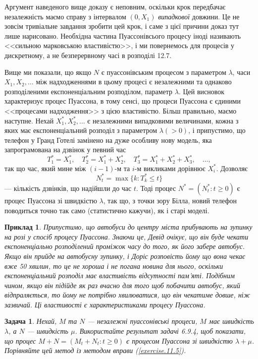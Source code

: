 \documentclass[12pt,fleqn]{article}
\newtheorem{example}{Приклад}[section]
\newtheorem{problem}{Задача}[section]
\numberwithin{figure}{section}
\numberwithin{equation}{section}
\begin{document}
Аргумент наведеного вище доказу є неповним, оскільки крок передбачає незалежність маємо справу з інтервалом $(0, X_1)$ \emph{випадкової} довжини. Це не зовсім тривіальне завдання зробити цей крок, і саме з цієї причини доказ тут лише нарисовано. Необхідна частина Пуассонівсього процесу іноді називають <<сильною марковською властивістю>>, і ми повернемось для процесів у дискретному, а не безперервному часі в розподілі 12.7.

Вище ми показали, що якщо $N$ є пуассонівським процесом з параметром $\lambda$, часи $X_1, X_2, \dots$ між надходженнями в цьому процесі є незалежними та однаково розподіленими експоненціальним розподілом, параметр $\lambda$. Цей висновок характеризує процес Пуассона, в тому сенсі, що процеси Пуассона є єдиними <<процесами надходження>> з цією властивістю. Більш правильно, маємо наступне. Нехай $X_{1}^{*}, X_{2}^{*}, \dots$ є незалежними випадковими величинами, кожна з яких має експоненціальний розподіл з параметром $\lambda (>0)$, і припустимо, що телефон у Гранд Готелі замінено на дуже особливу нову модель, яка запрограмована на дзвінок у певний час
$$T_{1}^{*}=X_{1}^{*},\quad T_{2}^{*}=X_{1}^{*}+X_{2}^{*}, \quad T_{3}^{*}=X_{1}^{*}+X_{2}^{*}+X_{3}^{*}, \quad \dots,$$
так що час, який мине між $(i-1)$-м та $i$-м викликами дорівнює $X_{i}^{*}$. Дозволяє
$$N_{t}^{*}=\max\{k: T_{k}^{*}\leq t\}$$
--- кількість дзвінків, що надійшли до час $t$. Тоді процес $N^{*}=(N_{t}^{*}:t\geq 0)$ є процес Пуассона зі швидкістю $\lambda$, так що, з точки зору Білла, новий телефон поводиться точно так само (статистично кажучи), як і старі моделі.

\begin{example}
    Припустимо, що автобуси до центру міста прибувають на зупинку на розі у спосіб процесу Пуассона. Знаючи це, Девід очікує, що він буде чекати експоненціально розподілений проміжок часу до того, як його забере автобус. Якщо він прийде на автобусну зупинку, і Доріс розповість йому що вона чекає вже 50 хвилин, то це не хороша і не погана новина для нього, оскільки експоненціальний розподіл має властивість відсутності пам'яті. Подібним чином, якщо він підійде як раз вчасно для того щоб побачити автобус, який відпраляється, то йому не потрібно хвилюватися, що він чекатиме довше, ніж зазвичай. Ці властивості є характеристиками процесу Пуассона.
\end{example}


\begin{problem}
     Нехай, $M$ та $N$ --- незалежні пуассонівські процеси, $M$ має швидкість $\lambda$, а $N$ --- швидкість $\mu$. Використайте результат задачі 6.9.4, щоб показати, що процес $M + N = (M_t + N_t : t \geq 0)$ є процесом Пуассона зі швидкістю $\lambda + \mu$. Порівняйте цей метод із методом вправи (\ref{exercise.11.5}).
\end{problem}
\end{document}
